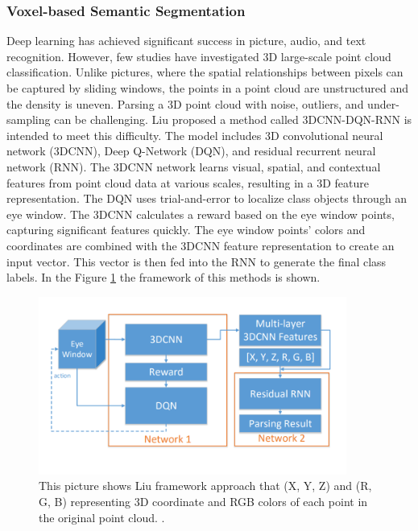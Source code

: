 \subsubsection{Voxel-based Semantic Segmentation}
Deep learning has achieved significant success in picture, audio, and text recognition. However, few studies have investigated 3D large-scale point cloud classification. Unlike pictures, where the spatial relationships between pixels can be captured by sliding windows, the points in a point cloud are unstructured and the density is uneven. Parsing a 3D point cloud with noise, outliers, and under-sampling can be challenging. Liu \cite{liu20173dcnn} proposed a method called  3DCNN-DQN-RNN is intended to meet this difficulty. The model includes 3D convolutional neural network (3DCNN), Deep Q-Network (DQN), and residual recurrent neural network (RNN). The 3DCNN network learns visual, spatial, and contextual features from point cloud data at various scales, resulting in a 3D feature representation. The DQN uses trial-and-error to localize class objects through an eye window. The 3DCNN calculates a reward based on the eye window points, capturing significant features quickly. The eye window points' colors and coordinates are combined with the 3DCNN feature representation to create an input vector. This vector is then fed into the RNN to generate the final class labels. In the Figure \ref{fig:Liu Framework approach} the framework of this methods is shown. 
\begin{figure}[H]
  \centering
  \includegraphics[width=0.9\textwidth]{Figures/Framework of Liu proposed approach.PNG}
  \caption[Illustration of Liu framework ]{This picture shows Liu framework approach that (X, Y, Z) and (R, G, B) representing 3D coordinate and RGB colors of each point in the original point cloud. \cite{liu20173dcnn}.}
  \label{fig:Liu Framework approach}
\end{figure}

